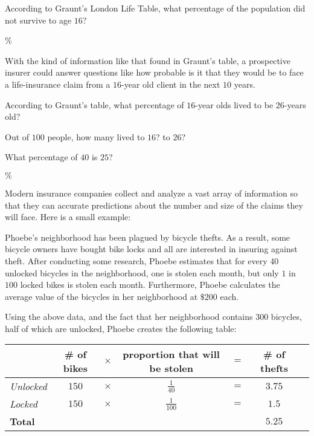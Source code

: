 \documentclass{ximera}
\begin{document}
\begin{question}
According to Graunt's London Life Table, what percentage of the population did not survive to age $16$?

\%
	
\end{question}

With the kind of information like that found in Graunt's table, a prospective insurer could answer questions like how probable is it that they would be to face a life-insurance claim from a $16$-year old client in the next $10$ years.

\begin{question}
According to Graunt's table, what percentage of $16$-year olds lived to be $26$-years old?

\begin{hint}
Out of $100$ people, how many lived to $16$? to $26$?
\end{hint}
\begin{hint}
What percentage of $40$ is $25$? 
\end{hint}
$\%$
	
\end{question}

Modern insurance companies collect and analyze a vast array of information so that they can accurate predictions about the number and size of the claims they will face. Here is a small example:

Phoebe's neighborhood has been plagued by bicycle thefts. As a result, some bicycle owners have bought bike locks and all are interested in insuring against theft. After conducting some research, Phoebe estimates that for every 40 unlocked bicycles in the neighborhood, one is stolen each month, but only $1$ in $100$ locked bikes is stolen each month. Furthermore, Phoebe calculates the average value of the bicycles in her neighborhood at $\$200$ each.

Using the above data, and the fact that her neighborhood contains 300 bicycles, half of which are unlocked, Phoebe creates the following table:

\renewcommand{\arraystretch}{2}
\begin{center}
\begin{tabular}{@{}lcccccc@{}}
 & \# of bikes & $\times$ & proportion that will be stolen & $=$ & \# of thefts\\\midrule
\textit{Unlocked} & $150$ & $\times$ & $\frac{1}{40}$ & $=$  & $3.75$\\
\textit{Locked} & $150$ & $\times$ & $\frac{1}{100}$ & $=$ & $1.5$\\\bottomrule
\textbf{Total} & & & & & \textbf{$5.25$}
\end{tabular}
\end{center}
\end{document}
